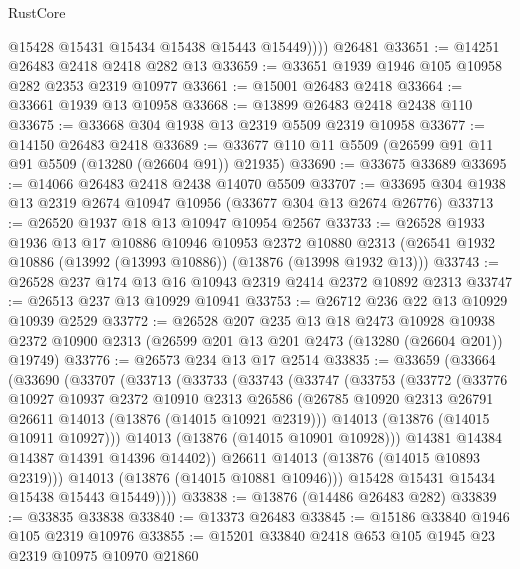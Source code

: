 \begin{lexlean}{RustCore}
\begin{coremodule}
            @15428
            @15431
            @15434
            @15438
            @15443
            @15449))))
    @26481
@33651 := @14251 @26483 @2418 @2418 @282 @13
@33659 := @33651 @1939 @1946 @105 @10958 @282 @2353 @2319 @10977
@33661 := @15001 @26483 @2418
@33664 := @33661 @1939 @13 @10958
@33668 := @13899 @26483 @2418 @2438 @110
@33675 := @33668 @304 @1938 @13 @2319 @5509 @2319 @10958
@33677 := @14150 @26483 @2418
@33689 := @33677 @110 @11 @5509 (@26599 @91 @11 @91 @5509 (@13280 (@26604 @91)) @21935)
@33690 := @33675 @33689
@33695 := @14066 @26483 @2418 @2438 @14070 @5509
@33707 := @33695 @304 @1938 @13 @2319 @2674 @10947 @10956 (@33677 @304 @13 @2674 @26776)
@33713 := @26520 @1937 @18 @13 @10947 @10954 @2567
@33733 := @26528
    @1933
    @1936
    @13
    @17
    @10886
    @10946
    @10953
    @2372
    @10880
    @2313
    (@26541 @1932 @10886 (@13992 (@13993 @10886)) (@13876 (@13998 @1932 @13)))
@33743 := @26528 @237 @174 @13 @16 @10943 @2319 @2414 @2372 @10892 @2313
@33747 := @26513 @237 @13 @10929 @10941
@33753 := @26712 @236 @22 @13 @10929 @10939 @2529
@33772 := @26528
    @207
    @235
    @13
    @18
    @2473
    @10928
    @10938
    @2372
    @10900
    @2313
    (@26599 @201 @13 @201 @2473 (@13280 (@26604 @201)) @19749)
@33776 := @26573 @234 @13 @17 @2514
@33835 := @33659
    (@33664
      (@33690
        (@33707
          (@33713
            (@33733
              (@33743
                (@33747
                  (@33753
                    (@33772
                      (@33776
                        @10927
                        @10937
                        @2372
                        @10910
                        @2313
                        @26586
                        (@26785 @10920 @2313 @26791 @26611 @14013 (@13876 (@14015 @10921 @2319)))
                        @14013
                        (@13876 (@14015 @10911 @10927)))
                      @14013
                      (@13876 (@14015 @10901 @10928)))
                    @14381
                    @14384
                    @14387
                    @14391
                    @14396
                    @14402))
                @26611
                @14013
                (@13876 (@14015 @10893 @2319)))
              @14013
              (@13876 (@14015 @10881 @10946)))
            @15428
            @15431
            @15434
            @15438
            @15443
            @15449))))
@33838 := @13876 (@14486 @26483 @282)
@33839 := @33835 @33838
@33840 := @13373 @26483
@33845 := @15186 @33840 @1946 @105 @2319 @10976
@33855 := @15201 @33840 @2418 @653 @105 @1945 @23 @2319 @10975 @10970 @21860

\end{coremodule}
\end{lexlean}
